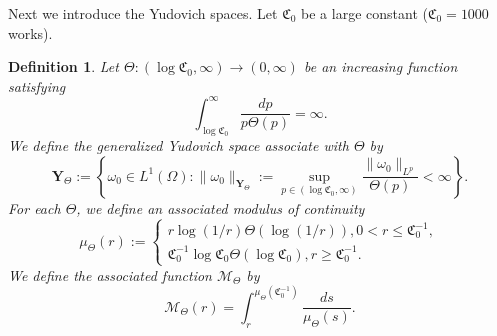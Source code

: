 \documentclass[12pt]{article}
\newtheorem{definition}{Definition}
\begin{document}
Next we introduce the Yudovich spaces. Let $\mathfrak{C}_0 $ be a large constant ($\mathfrak{C}_0 = 1000$ works).
\begin{definition}
Let $\Theta : (\log \mathfrak{C}_0 , \infty) \rightarrow (0, \infty)$ be an increasing function satisfying 
\begin{equation} \label{Thetagrowth}
\int_{\log \mathfrak{C}_0 } ^\infty \frac{dp}{p \Theta(p) }  = \infty.
\end{equation}
We define the generalized Yudovich space associate with $\Theta$ by
\begin{equation}\label{Yspace}
\mathbf{Y}_{\Theta}  := \left \{ \omega_0 \in L^1 (\Omega) :\| \omega_0 \|_{\mathbf{Y}_{\Theta} }:= \sup_{p \in (\log \mathfrak{C}_0 , \infty) } \frac{ \| \omega_0 \|_{L^p} }{\Theta(p) } < \infty \right \}.
\end{equation}
For each $\Theta$, we define an associated modulus of continuity
\begin{equation}\label{Mutheta}
\mu_{\Theta} (r) := \begin{cases}
r \log (1/r) \Theta (\log (1/r) ), 0 < r \le \mathfrak{C}_0^{-1}, \\
\mathfrak{C}_0^{-1} \log \mathfrak{C}_0  \Theta (\log \mathfrak{C}_0 ) , r \ge \mathfrak{C}_0^{-1}.
\end{cases}
\end{equation}
We define the associated function $\mathcal{M}_{\Theta}$ by
\begin{equation}\label{Mmod}
\mathcal{M}_{\Theta} (r) = \int_r ^{\mu_{\Theta} (\mathfrak{C}_0^{-1} ) } \frac{ds}{\mu_{\Theta} (s) }.
\end{equation}
\end{definition}
\end{document}
